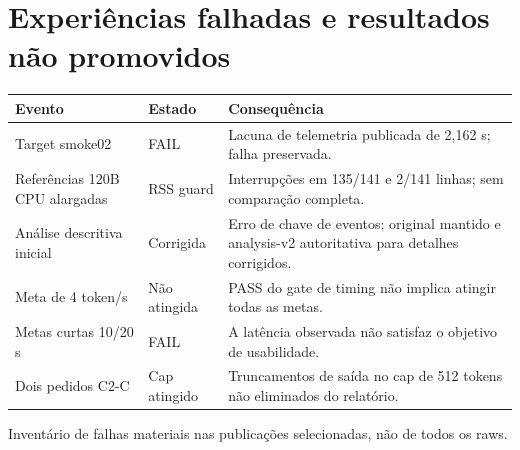 \clearpage
\section{Experiências falhadas e resultados não promovidos}
\begin{tabularx}{\linewidth}{@{}p{34mm}p{25mm}Y@{}}
\toprule \textbf{Evento} & \textbf{Estado} & \textbf{Consequência}\\ \midrule
Target smoke02 & FAIL & Lacuna de telemetria publicada de 2,162 s; falha preservada.\\
Referências 120B CPU alargadas & RSS guard & Interrupções em 135/141 e 2/141 linhas; sem comparação completa.\\
Análise descritiva inicial & Corrigida & Erro de chave de eventos; original mantido e analysis-v2 autoritativa para detalhes corrigidos.\\
Meta de 4 token/s & Não atingida & PASS do gate de timing não implica atingir todas as metas.\\
Metas curtas 10/20 s & FAIL & A latência observada não satisfaz o objetivo de usabilidade.\\
Dois pedidos C2-C & Cap atingido & Truncamentos de saída no cap de 512 tokens não eliminados do relatório.\\
\bottomrule
\end{tabularx}
{\small Inventário de falhas materiais nas publicações selecionadas, não de todos os raws.   }



